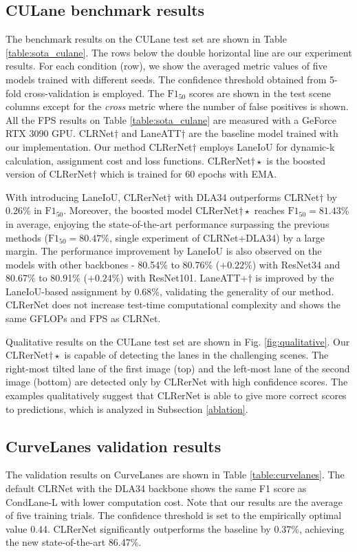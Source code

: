 \documentclass[10pt,twocolumn,letterpaper]{article}
\begin{document}
\subsection{CULane benchmark results}
The benchmark results on the CULane test set are shown in Table \ref{table:sota_culane}. 
The rows below the double horizontal line are our experiment results. 
For each condition (row), we show the averaged metric values of five models trained with different seeds.
The confidence threshold obtained from 5-fold cross-validation is employed. 
The $\text{F1}_{50}$ scores are shown in the test scene columns except for the \textit{cross} metric where the number of false positives is shown.
All the FPS results on Table \ref{table:sota_culane} are measured with a GeForce RTX 3090 GPU.
CLRNet$\dagger$ and LaneATT$\dagger$ are the baseline model trained with our implementation.
Our method CLRerNet$\dagger$ employs LaneIoU for dynamic-k calculation, assignment cost and loss functions. CLRerNet$\dagger\star$ is the boosted version of CLRerNet$\dagger$ which is trained for 60 epochs with EMA.

With introducing LaneIoU, CLRerNet$\dagger$ with DLA34 outperforms CLRNet$\dagger$ by 0.26\% in $\text{F1}_{50}$. Moreover, the boosted model CLRerNet$\dagger\star$ reaches $\text{F1}_{50}=81.43\%$ in average, enjoying the state-of-the-art performance surpassing the previous methods ($\text{F1}_{50}=80.47\%$, single experiment of CLRNet+DLA34) by a large margin.
The performance improvement by LaneIoU is also observed on the models with other backbones - 80.54\% to 80.76\% ($+0.22\%$) with ResNet34 and 80.67\% to 80.91\% ($+0.24\%$) with ResNet101.
LaneATT+$\dagger$ is improved by the LaneIoU-based assignment by 0.68\%, validating the generality of our method.
CLRerNet does not increase test-time computational complexity and shows the same GFLOPs and FPS as CLRNet.

Qualitative results on the CULane test set are shown in Fig. \ref{fig:qualitative}. Our CLRerNet$\dagger\star$ is capable of detecting the lanes in the challenging scenes. 
The right-most tilted lane of the first image (top) and the left-most lane of the second image (bottom) are detected only by CLRerNet with high confidence scores.
The examples qualitatively suggest that CLRerNet is able to give more correct scores to predictions, which is analyzed in Subsection \ref{ablation}.


\subsection{CurveLanes validation results}
The validation results on CurveLanes are shown in Table \ref{table:curvelanes}.
The default CLRNet \cite{Zheng_2022_CVPR} with the DLA34 backbone shows the same F1 score as CondLane-L\cite{Liu_2021_ICCV} with lower computation cost. Note that our results are the average of five training trials. The confidence threshold is set to the empirically optimal value 0.44. CLRerNet significantly outperforms the baseline by 0.37\%, achieving the new state-of-the-art 86.47\%. 
\end{document}
